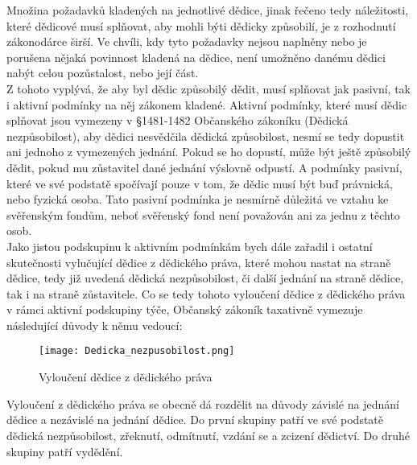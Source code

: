 \documentclass{article}
\begin{document}
Množina požadavků kladených na jednotlivé dědice, jinak řečeno tedy náležitosti, které dědicové musí splňovat, aby mohli býti dědicky způsobilí, je z rozhodnutí zákonodárce širší. Ve chvíli, kdy tyto požadavky nejsou naplněny nebo je porušena nějaká povinnost kladená na dědice, není umožněno danému dědici nabýt celou pozůstalost, nebo její část. \\

Z tohoto vyplývá, že aby byl dědic způsobilý dědit, musí splňovat jak pasivní, tak i aktivní podmínky na něj zákonem kladené. Aktivní podmínky, které musí dědic splňovat jsou vymezeny v §1481-1482 Občanského zákoníku (Dědická nezpůsobilost), aby dědici nesvědčila dědická způsobilost, nesmí se tedy dopustit ani jednoho z vymezených jednání. Pokud se ho dopustí, může být ještě způsobilý dědit, pokud mu zůstavitel dané jednání výslovně odpustí. A podmínky pasivní, které ve své podstatě spočívají pouze v tom, že dědic musí být buď právnická, nebo fyzická osoba. Tato pasivní podmínka je nesmírně důležitá ve vztahu ke svěřenským fondům, neboť svěřenský fond není považován ani za jednu z těchto osob.\\


Jako jistou podskupinu k aktivním podmínkám bych dále zařadil i ostatní skutečnosti vylučující dědice z dědického práva, které mohou nastat na straně dědice, tedy již uvedená dědická nezpůsobilost, či další jednání na straně dědice, tak i na straně zůstavitele. Co se tedy tohoto vyloučení dědice z dědického práva v rámci aktivní podskupiny týče, Občanský zákoník taxativně vymezuje následující důvody k němu vedoucí:

\begin{figure}[h]
\centering
\texttt{[image: Dedicka\_nezpusobilost.png]}
\caption[Vyloučení dědice z dědického práva]{Vyloučení dědice z dědického práva}
\label{fig:komparace}
\end{figure}

Vyloučení z dědického práva se obecně dá rozdělit na důvody závislé na jednání dědice a nezávislé na jednání dědice. Do první skupiny patří ve své podstatě dědická nezpůsobilost, zřeknutí, odmítnutí, vzdání se a zcizení dědictví. Do druhé skupiny patří vydědění. \\
\end{document}
